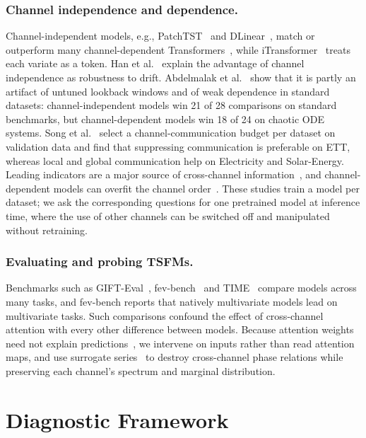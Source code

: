 \documentclass[runningheads]{llncs}
\begin{document}
\subsubsection{Channel independence and dependence.}
Channel-independent models, e.g., PatchTST~\cite{nie2023patchtst} and
DLinear~\cite{zeng2023dlinear}, match or outperform many channel-dependent
Transformers~\cite{zhou2021informer,wu2021autoformer,zhou2022fedformer},
while iTransformer~\cite{liu2024itransformer} treats each variate as a token.
Han et al.~\cite{han2024capacity} explain the advantage of channel
independence as robustness to drift. Abdelmalak et
al.~\cite{abdelmalak2025lookback} show that it is partly an artifact of
untuned lookback windows and of weak dependence in standard datasets:
channel-independent models win 21 of 28 comparisons on standard benchmarks,
but channel-dependent models win 18 of 24 on chaotic ODE systems. Song et
al.~\cite{song2026cloc} select a channel-communication budget per dataset on
validation data and find that suppressing communication is preferable on ETT,
whereas local and global communication help on Electricity and Solar-Energy.
Leading indicators are a major source of cross-channel
information~\cite{lift2024}, and channel-dependent models can overfit the
channel order~\cite{cpiri2026}. These studies train a model per dataset; we
ask the corresponding questions for one pretrained model at inference time,
where the use of other channels can be switched off and manipulated without
retraining.

\subsubsection{Evaluating and probing TSFMs.}
Benchmarks such as GIFT-Eval~\cite{gifteval2024},
fev-bench~\cite{fevbench2025} and TIME~\cite{timebench2026} compare models
across many tasks, and fev-bench reports that natively multivariate models
lead on multivariate tasks. Such comparisons confound the effect of
cross-channel attention with every other difference between models. Because
attention weights need not explain predictions~\cite{jain2019attention}, we
intervene on inputs rather than read attention maps, and use surrogate
series~\cite{schreiber1996surrogate} to destroy cross-channel phase relations
while preserving each channel's spectrum and marginal distribution.

\section{Diagnostic Framework}\label{sec:framework}
\end{document}
